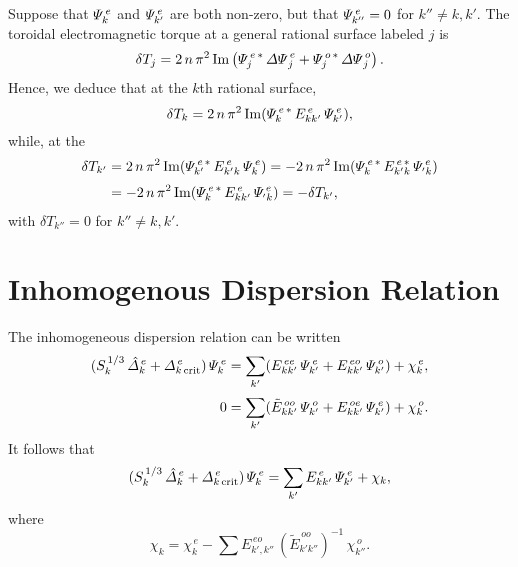 \documentclass[12pt,prb,aps,notitlepage]{revtex4-1}
\begin{document}
Suppose that ${\mit\Psi}_k^{\,e}$ and ${\mit\Psi}_{k'}^{\,e}$ are both non-zero, but that ${\mit\Psi}^{\,e}_{k''}=0$ for $k''\neq k, k'$. 
The toroidal electromagnetic torque at a general rational surface labeled  $j$ is
\begin{equation}
\delta T_j =  2\,n\,\pi^2\,{\rm Im}\left({\mit\Psi}^{\,e\,\ast}_j \,{\mit\Delta\Psi}^{\,e}_j +{\mit\Psi}^{\,o\,\ast}_j \,{\mit\Delta\Psi}^{\,o}_j\right).
\end{equation}
Hence, we deduce that at the $k$th rational surface,
\begin{equation}
\delta T_k = 2\,n\,\pi^2\,{\rm Im}({\mit\Psi}_k^{\,e\,\ast}\,E^{\,e}_{kk'}\,{\mit\Psi}_{k'}^{\,e}),
\end{equation}
while, at the 
\begin{align}
\delta T_{k'} &= 2\,n\,\pi^2\,{\rm Im}({\mit\Psi}_{k'}^{\,e\,\ast}\,E^{\,e}_{k'k}\,{\mit\Psi}_{k}^{\,e}) = -  2\,n\,\pi^2\,{\rm Im}({\mit\Psi}_{k}^{\,e\,\ast}\,E^{\,e\,\ast}_{k'k}\,{\mit\Psi}_{'k}^{\,e}) 
\nonumber\\[0.5ex]
&= -  2\,n\,\pi^2\,{\rm Im}({\mit\Psi}_{k}^{\,e\,\ast}\,E^{\,e}_{kk'}\,{\mit\Psi}_{'k}^{\,e}) = -\delta T_{k'},
\end{align}
with $\delta T_{k''}=0$ for $k''\neq k, k'$. 

\section{Inhomogenous Dispersion Relation}
The inhomogeneous dispersion relation can be written
\begin{align}
(S_k^{\,1/3}\,\hat{\mit\Delta}_k^{\,e}+ {\mit\Delta}_{k\,{\rm crit}}^{\,e})\,{\mit\Psi}_k^{\,e} &= \sum_{k'}(E_{kk'}^{\,ee}\,{\mit\Psi}_{k'}^{\,e}+E_{kk'}^{\,eo}\,{\mit\Psi}_{k'}^{\,o}) + \chi^{\,e}_k,\\[0.5ex]
0&= \sum_{k'}(\tilde{E}_{kk'}^{\,oo}\,{\mit\Psi}_{k'}^{\,o}+E_{kk'}^{\,oe}\,{\mit\Psi}_{k'}^{\,e})+\chi_{k}^{\,o}.
\end{align}
It follows that
\begin{equation}
(S_k^{\,1/3}\,\hat{\mit\Delta}_k^{\,e}+ {\mit\Delta}_{k\,{\rm crit}}^{\,e})\,{\mit\Psi}_k^{\,e} =\sum_{k'} E^{\,e}_{kk'}\,{\mit\Psi}^{\,e}_{k'}+ \chi_k,
\end{equation}
where
\begin{equation}
\chi_k = \chi^{\,e}_k - \sum E^{\,eo}_{k',k''}\,(\tilde{E}^{\,oo}_{k'k''})^{-1}\,\chi^{\,o}_{k''}.
\end{equation}
\end{document}

